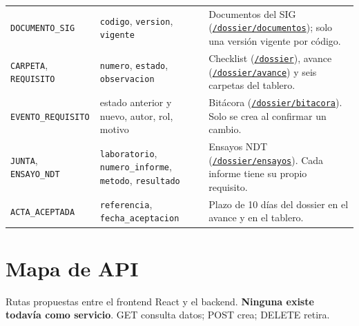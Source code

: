 \documentclass[11pt]{article}
\newcommand{\urlapp}{https://thankstochatgpt.github.io/LOARD}
\newcommand{\app}[1]{\href{\urlapp#1}{\texttt{#1}}}
\begin{document}
\begin{longtable}{>{\raggedright\arraybackslash}p{3.3cm} >{\raggedright\arraybackslash}p{5cm} >{\raggedright\arraybackslash}p{7.2cm}}
\texttt{DOCUMENTO\_SIG} & \texttt{codigo}, \texttt{version}, \texttt{vigente} & Documentos del SIG (\app{/dossier/documentos}); solo una versión vigente por código. \\
\texttt{CARPETA}, \texttt{REQUISITO} & \texttt{numero}, \texttt{estado}, \texttt{observacion} & Checklist (\app{/dossier}), avance (\app{/dossier/avance}) y seis carpetas del tablero. \\
\texttt{EVENTO\_REQUISITO} & estado anterior y nuevo, autor, rol, motivo & Bitácora (\app{/dossier/bitacora}). Solo se crea al confirmar un cambio. \\
\texttt{JUNTA}, \texttt{ENSAYO\_NDT} & \texttt{laboratorio}, \texttt{numero\_informe}, \texttt{metodo}, \texttt{resultado} & Ensayos NDT (\app{/dossier/ensayos}). Cada informe tiene su propio requisito. \\
\texttt{ACTA\_ACEPTADA} & \texttt{referencia}, \texttt{fecha\_aceptacion} & Plazo de 10 días del dossier en el avance y en el tablero. \\
\end{longtable}
\normalsize

\section{Mapa de API}

Rutas propuestas entre el frontend React y el backend. \textbf{Ninguna existe todavía como servicio}. GET consulta datos; POST crea; DELETE retira.
\end{document}
